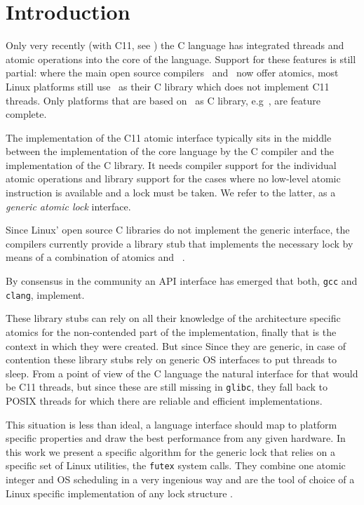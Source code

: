 
\section{Introduction}
\label{sec-1}

Only very recently (with C11, see \citeauthor{C11}) the C language has
integrated threads and atomic operations into the core of the
language.  Support for these features is still partial: where the
main open source compilers~\citeauthor{gcc} and~\citeauthor{clang} now offer atomics, most Linux
platforms still use~\citeauthor{glibc}
as their C library which does not implement C11 threads. Only
platforms that are based on~\citeauthor{musl} as C
library, e.g~\citeauthor{alpine}, are
feature complete.

The implementation of the C11 atomic interface typically sits in the
middle between the implementation of the core language by the C
compiler and the implementation of the C library. It needs compiler
support for the individual atomic operations and library support for
the cases where no low-level atomic instruction is available and a
lock must be taken. We refer to the latter, as a \emph{generic atomic
lock} interface.

Since Linux' open source C libraries do not implement the generic
interface, the compilers currently provide a library stub that
implements the necessary lock by means of a combination of atomics
and~\citeauthor{POSIX2009}
.

\iflong%
By consensus in the community an API interface
has emerged that both, \texttt{gcc} and \texttt{clang}, implement.
\fi%

\iflong%
These library stubs can rely on all their knowledge of the architecture
specific atomics for the non-contended part of the implementation, finally
that is the context in which they were created. But since
\else%
Since
\fi%
they are generic, in case of contention these
library stubs rely on generic OS interfaces to put threads to
sleep. From a point of view of the C language the natural interface
for that would be C11 threads,
but since these are still missing in \texttt{glibc}, they fall back to
POSIX threads for which there are reliable and efficient implementations.

This situation is less than ideal, a language interface
should map to platform specific properties
and draw the best performance from any given hardware. In
this work we present a specific algorithm for the generic lock that
relies on a specific set of Linux utilities, the \texttt{futex} system
calls. They combine one atomic integer and OS
scheduling%
\iflong%
in a very ingenious way and are the tool of choice of a
Linux specific implementation of any lock structure
\fi%
.

